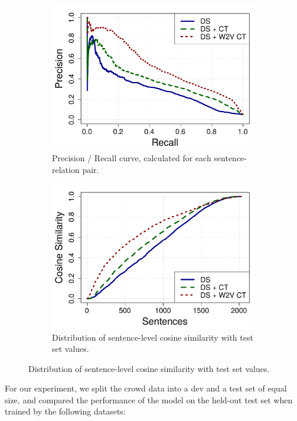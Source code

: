 \begin{figure}[tbh!]
\centering
\begin{subfigure}{.5\textwidth}
\caption{Precision / Recall curve, calculated for each sentence-relation pair.}
\label{fig:pr}
\includegraphics[width=\linewidth]{img/pr.pdf}
\end{subfigure}%
\begin{subfigure}{.5\textwidth}
\caption{Distribution of sentence-level cosine similarity with test set values.}
\label{fig:cos_sim}
\includegraphics[width=\linewidth]{img/cos_sim.pdf}
\end{subfigure}
\end{figure}

For our experiment, we split the crowd data into a dev and a test set of equal size, and compared the performance of the model on the held-out test set when trained by the following datasets:


